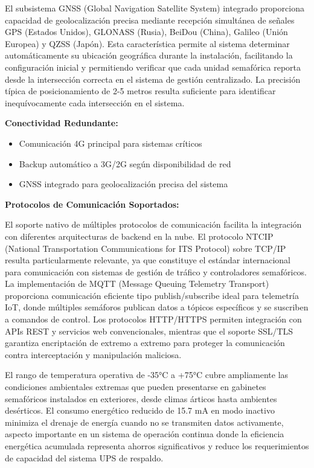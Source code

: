 \documentclass[12pt,a4paper,oneside]{report}
\begin{document}
El subsistema GNSS (Global Navigation Satellite System) integrado proporciona capacidad de geolocalización precisa mediante recepción simultánea de señales GPS (Estados Unidos), GLONASS (Rusia), BeiDou (China), Galileo (Unión Europea) y QZSS (Japón). Esta característica permite al sistema determinar automáticamente su ubicación geográfica durante la instalación, facilitando la configuración inicial y permitiendo verificar que cada unidad semafórica reporta desde la intersección correcta en el sistema de gestión centralizado. La precisión típica de posicionamiento de 2-5 metros resulta suficiente para identificar inequívocamente cada intersección en el sistema.

\textbf{Conectividad Redundante:}

\begin{itemize}
\item
  Comunicación 4G principal para sistemas críticos
\item
  Backup automático a 3G/2G según disponibilidad de red
\item
  GNSS integrado para geolocalización precisa del sistema
\end{itemize}

\textbf{Protocolos de Comunicación Soportados:}

El soporte nativo de múltiples protocolos de comunicación facilita la integración con diferentes arquitecturas de backend en la nube. El protocolo NTCIP (National Transportation Communications for ITS Protocol) sobre TCP/IP resulta particularmente relevante, ya que constituye el estándar internacional para comunicación con sistemas de gestión de tráfico y controladores semafóricos. La implementación de MQTT (Message Queuing Telemetry Transport) proporciona comunicación eficiente tipo publish/subscribe ideal para telemetría IoT, donde múltiples semáforos publican datos a tópicos específicos y se suscriben a comandos de control. Los protocolos HTTP/HTTPS permiten integración con APIs REST y servicios web convencionales, mientras que el soporte SSL/TLS garantiza encriptación de extremo a extremo para proteger la comunicación contra interceptación y manipulación maliciosa.

El rango de temperatura operativa de -35°C a +75°C cubre ampliamente las condiciones ambientales extremas que pueden presentarse en gabinetes semafóricos instalados en exteriores, desde climas árticos hasta ambientes desérticos. El consumo energético reducido de 15.7 mA en modo inactivo minimiza el drenaje de energía cuando no se transmiten datos activamente, aspecto importante en un sistema de operación continua donde la eficiencia energética acumulada representa ahorros significativos y reduce los requerimientos de capacidad del sistema UPS de respaldo.
\end{document}
